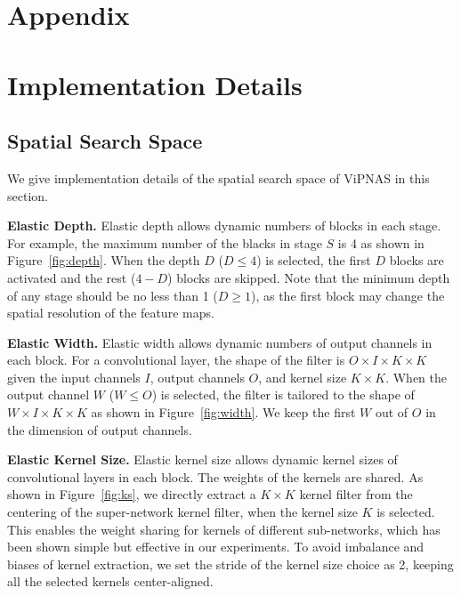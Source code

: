 \documentclass[final]{cvpr}
\begin{document}
{\small


}


\appendix
\section*{\Large Appendix}
\setcounter{table}{0}
\renewcommand{\thetable}{A\arabic{table}}
\setcounter{figure}{0}
\renewcommand{\thefigure}{A\arabic{figure}}


\section{Implementation Details}
\label{sec:supp_implementation}
\subsection{Spatial Search Space}
\label{sec:supp_spatial_search_space}
We give implementation details of the spatial search space of ViPNAS in this section.

\textbf{Elastic Depth.} 
Elastic depth allows dynamic numbers of blocks in each stage. For example, the maximum number of the blacks in stage $S$ is 4 as shown in Figure~\ref{fig:depth}. When the depth $D$ ($D\leq4$) is selected, the first $D$ blocks are activated and the rest ($4-D$) blocks are skipped. Note that the minimum depth of any stage should be no less than 1 ($D\geq1$), as the first block may change the spatial resolution of the feature maps.


\textbf{Elastic Width.}
Elastic width allows dynamic numbers of output channels in each block. For a convolutional layer, the shape of the filter is $O \times I \times K \times K$ given the input channels $I$, output channels $O$, and kernel size $K \times K$. When the output channel $W$ ($W \leq O$) is selected, the filter is tailored to the shape of $W \times I \times K \times K$ as shown in Figure~\ref{fig:width}. We keep the first $W$ out of $O$ in the dimension of output channels.



\textbf{Elastic Kernel Size.}
Elastic kernel size allows dynamic kernel sizes of convolutional layers in each block. The weights of the kernels are shared. As shown in Figure~\ref{fig:ks}, we directly extract a $K \times K$ kernel filter from the centering of the super-network kernel filter, when the kernel size $K$ is selected. This enables the weight sharing for kernels of different sub-networks, which has been shown simple but effective in our experiments. To avoid imbalance and biases of kernel extraction, we set the stride of the kernel size choice as 2, keeping all the selected kernels center-aligned.
\end{document}
